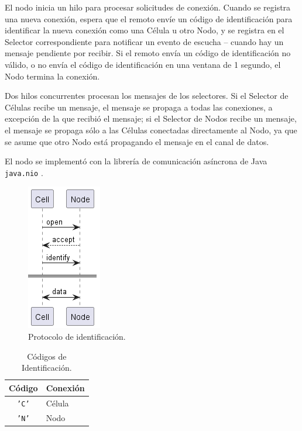 \documentclass[conference,compsoc]{IEEEtran}
\begin{document}
El nodo inicia un hilo para procesar solicitudes de conexión. Cuando se registra una nueva conexión, espera que el remoto envíe un código de identificación para identificar la nueva conexión como una Célula u otro Nodo, y se registra en el Selector correspondiente para notificar un evento de escucha -- cuando hay un mensaje pendiente por recibir. Si el remoto envía un código de identificación no válido, o no envía el código de identificación en una ventana de 1 segundo, el Nodo termina la conexión.

Dos hilos concurrentes procesan los mensajes de los selectores. Si el Selector de Células recibe un mensaje, el mensaje se propaga a todas las conexiones, a excepción de la que recibió el mensaje; si el Selector de Nodos recibe un mensaje, el mensaje se propaga sólo a las Células conectadas directamente al Nodo, ya que se asume que otro Nodo está propagando el mensaje en el canal de datos.

El nodo se implementó con la librería de comunicación asíncrona de Java \texttt{java.nio} \cite{java17NIO}.

\begin{figure}[htb]
    \centering
    \includegraphics[width=0.3\columnwidth]{protocol.png}
    \caption{Protocolo de identificación.}
    \label{fig:protocol}
\end{figure}

\begin{table}[hb]
    \centering
    \caption{Códigos de Identificación.}
    \label{tab:handshake}
    \begin{tabular}{|c|l|}
    \hline
    \textbf{Código} & \textbf{Conexión} \\ \hline
    \texttt{'C'}    & Célula \\ \hline
    \texttt{'N'}    & Nodo \\ \hline
    \end{tabular}
\end{table}
\end{document}
